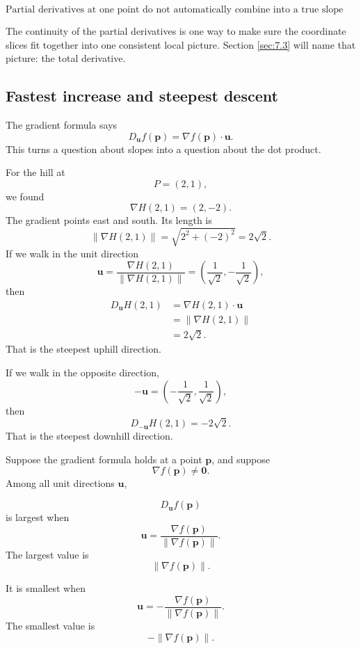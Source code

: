 \[
    \text{Partial derivatives at one point do not automatically combine into a true slope formula.}
\]

The continuity of the partial derivatives is one way to make sure the coordinate slices
fit together into one consistent local picture.  Section \ref{sec:7.3} will name that
picture: the total derivative.

\subsection{Fastest increase and steepest descent}

The gradient formula says
\[
    D_{\mathbf u}f(\mathbf p)=\nabla f(\mathbf p)\cdot\mathbf u.
\]
This turns a question about slopes into a question about the dot product.

For the hill at
\[
    P=(2,1),
\]
we found
\[
    \nabla H(2,1)=(2,-2).
\]
The gradient points east and south.  Its length is
\[
    \|\nabla H(2,1)\|
    =
    \sqrt{2^2+(-2)^2}
    =
    2\sqrt2.
\]
If we walk in the unit direction
\[
    \mathbf u=\frac{\nabla H(2,1)}{\|\nabla H(2,1)\|}
    =
    \left(\frac1{\sqrt2},-\frac1{\sqrt2}\right),
\]
then
\[
\begin{aligned}
D_{\mathbf u}H(2,1)
&=
\nabla H(2,1)\cdot\mathbf u\\
&=
\|\nabla H(2,1)\|\\
&=
2\sqrt2.
\end{aligned}
\]
That is the steepest uphill direction.

If we walk in the opposite direction,
\[
    -\mathbf u=
    \left(-\frac1{\sqrt2},\frac1{\sqrt2}\right),
\]
then
\[
    D_{-\mathbf u}H(2,1)=-2\sqrt2.
\]
That is the steepest downhill direction.

\begin{theorem}
Suppose the gradient formula holds at a point \(\mathbf p\), and suppose
\[
    \nabla f(\mathbf p)\ne\mathbf 0.
\]
Among all unit directions \(\mathbf u\),

\[
\boxed{
    D_{\mathbf u}f(\mathbf p)
}
\]
is largest when
\[
\boxed{
    \mathbf u=
    \frac{\nabla f(\mathbf p)}{\|\nabla f(\mathbf p)\|}.
}
\]
The largest value is
\[
\boxed{
    \|\nabla f(\mathbf p)\|.
}
\]

It is smallest when
\[
\boxed{
    \mathbf u=
    -\frac{\nabla f(\mathbf p)}{\|\nabla f(\mathbf p)\|}.
}
\]
The smallest value is
\[
\boxed{
    -\|\nabla f(\mathbf p)\|.
}
\]
\end{theorem}


